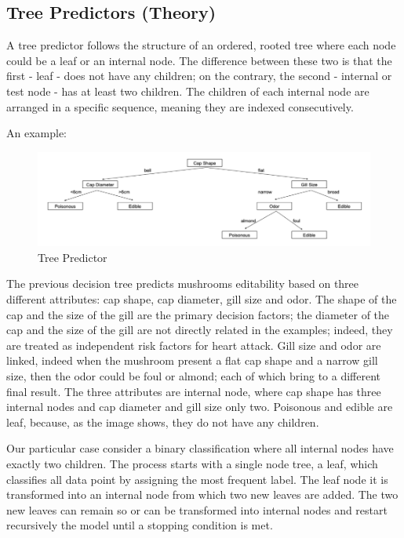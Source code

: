 \documentclass{article}
\begin{document}
\subsection{Tree Predictors (Theory)}


A tree predictor follows the structure of an ordered, rooted tree where each node could be a leaf or an internal node. The difference between these two is that the first - leaf - does not have any children; on the contrary, the second - internal or test node - has at least two children. The children of each internal node are arranged in a specific sequence, meaning they are indexed consecutively.

An example:

\begin{figure}[H]
\centering
\includegraphics[width=1\linewidth]{TreePredictors.png}
\caption{\label{fig:frog}Tree Predictor}
\end{figure}

The previous decision tree predicts mushrooms editability based on three different attributes: cap shape, cap diameter, gill size and odor. The shape of the cap and the size of the gill are the primary decision factors; the diameter of the cap and the size of the gill are not directly related in the examples; indeed, they are treated as independent risk factors for heart attack. Gill size and odor are linked, indeed when the mushroom present a flat cap shape and a narrow gill size, then the odor could be foul or almond; each of which bring to a different final result.
The three attributes are internal node, where cap shape has three internal nodes and cap diameter and gill size only two. Poisonous and edible are leaf, because, as the image shows, they do not have any children.

Our particular case consider a binary classification where all internal nodes have exactly two children. The process starts with a single node tree, a leaf, which classifies all data point by assigning the most frequent label. The leaf node it is transformed into an internal node from which two new leaves are added. The two new leaves can remain so or can be transformed into internal nodes and restart recursively the model until a stopping condition is met.
\end{document}
